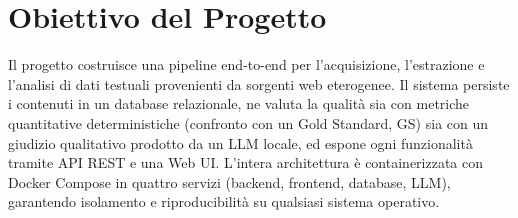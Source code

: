 \documentclass[11pt]{article}
\newcommand{\aclfinalcopy}{}
\begin{document}
\aclfinalcopy
{}

\section{Obiettivo del Progetto}
Il progetto costruisce una pipeline end-to-end per l'acquisizione, l'estrazione e l'analisi di dati testuali provenienti da sorgenti web eterogenee. Il sistema persiste i contenuti in un database relazionale, ne valuta la qualità sia con metriche quantitative deterministiche (confronto con un Gold Standard, GS) sia con un giudizio qualitativo prodotto da un LLM locale, ed espone ogni funzionalità tramite API REST e una Web UI. L'intera architettura è containerizzata con Docker Compose in quattro servizi (backend, frontend, database, LLM), garantendo isolamento e riproducibilità su qualsiasi sistema operativo.
\end{document}
